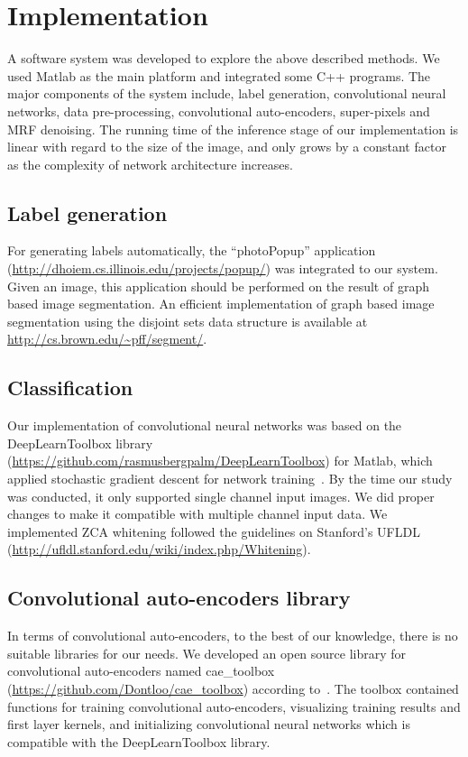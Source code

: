 \section{Implementation}
\label{sec:Implementation}
A software system was developed to explore the above described methods. We used Matlab as the main platform and integrated some C++ programs. The major components of the system include, label generation, convolutional neural networks, data pre-processing, convolutional auto-encoders, super-pixels and MRF denoising. The running time of the inference stage of our implementation is linear with regard to the size of the image, and only grows by a constant factor as the complexity of network architecture increases.

\subsection{Label generation}
For generating labels automatically, the ``photoPopup'' application (\url{http://dhoiem.cs.illinois.edu/projects/popup/}) was integrated to our system. Given an image, this application should be performed on the result of graph based image segmentation. An efficient implementation of graph based image segmentation using the disjoint sets data structure is available at \url{http://cs.brown.edu/~pff/segment/}.

\subsection{Classification}
Our implementation of convolutional neural networks was based on the DeepLearnToolbox library (\url{https://github.com/rasmusbergpalm/DeepLearnToolbox}) for Matlab, which applied stochastic gradient descent for network training~\cite{IMM2012-06284}. By the time our study was conducted, it only supported single channel input images. We did proper changes to make it compatible with multiple channel input data. We implemented ZCA whitening followed the guidelines on Stanford's UFLDL (\url{http://ufldl.stanford.edu/wiki/index.php/Whitening}).

\subsection{Convolutional auto-encoders library}
In terms of convolutional auto-encoders, to the best of our knowledge, there is no suitable libraries for our needs. We developed an open source library for convolutional auto-encoders named cae\_toolbox (\url{https://github.com/Dontloo/cae_toolbox}) according to~\cite{masci2011stacked}. The toolbox contained functions for training convolutional auto-encoders, visualizing training results and first layer kernels, and initializing convolutional neural networks which is compatible with the DeepLearnToolbox library.


